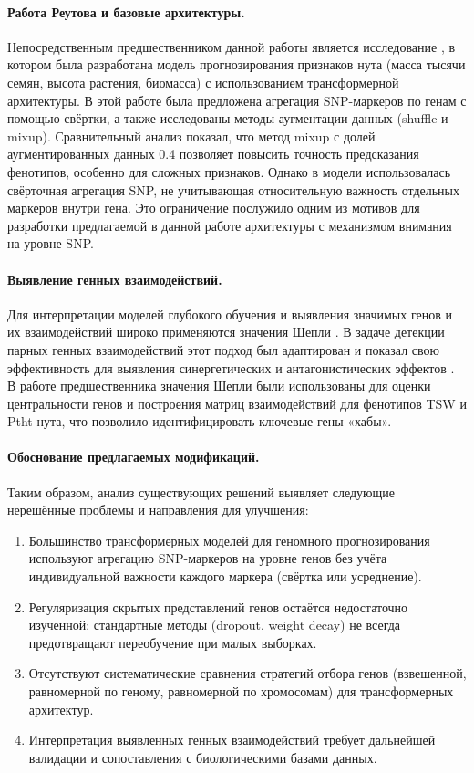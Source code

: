 \paragraph{Работа Реутова и базовые архитектуры.}
Непосредственным предшественником данной работы является исследование \cite{Reutov2025}, в котором была разработана модель прогнозирования признаков нута (масса тысячи семян, высота растения, биомасса) с использованием трансформерной архитектуры. В этой работе была предложена агрегация SNP-маркеров по генам с помощью свёртки, а также исследованы методы аугментации данных (shuffle и mixup). Сравнительный анализ показал, что метод mixup с долей аугментированных данных 0.4 позволяет повысить точность предсказания фенотипов, особенно для сложных признаков. Однако в модели \cite{Reutov2025} использовалась свёрточная агрегация SNP, не учитывающая относительную важность отдельных маркеров внутри гена. Это ограничение послужило одним из мотивов для разработки предлагаемой в данной работе архитектуры с механизмом внимания на уровне SNP.

\paragraph{Выявление генных взаимодействий.}
Для интерпретации моделей глубокого обучения и выявления значимых генов и их взаимодействий широко применяются значения Шепли \cite{Shapley1953, Lundberg2017}. В задаче детекции парных генных взаимодействий этот подход был адаптирован и показал свою эффективность для выявления синергетических и антагонистических эффектов \cite{Cui2022}. В работе предшественника \cite{Reutov2025} значения Шепли были использованы для оценки центральности генов и построения матриц взаимодействий для фенотипов TSW и Ptht нута, что позволило идентифицировать ключевые гены-«хабы».

\paragraph{Обоснование предлагаемых модификаций.}
Таким образом, анализ существующих решений выявляет следующие нерешённые проблемы и направления для улучшения:

\begin{enumerate}
	\item Большинство трансформерных моделей для геномного прогнозирования используют агрегацию SNP-маркеров на уровне генов без учёта индивидуальной важности каждого маркера (свёртка или усреднение).
	\item Регуляризация скрытых представлений генов остаётся недостаточно изученной; стандартные методы (dropout, weight decay) не всегда предотвращают переобучение при малых выборках.
	\item Отсутствуют систематические сравнения стратегий отбора генов (взвешенной, равномерной по геному, равномерной по хромосомам) для трансформерных архитектур.
	\item Интерпретация выявленных генных взаимодействий требует дальнейшей валидации и сопоставления с биологическими базами данных.
\end{enumerate}

